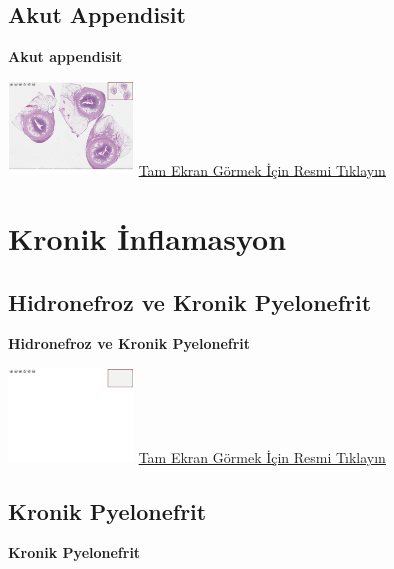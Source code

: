 \documentclass[
  letterpaper,
  DIV=11,
  numbers=noendperiod]{scrreprt}
\begin{document}
\hypertarget{sec-akut-appendisit}{%
\section{Akut Appendisit}\label{sec-akut-appendisit}}

\textbf{Akut appendisit}

\href{https://images.patolojiatlasi.com/acute-appendicitis/HE.html}{\includegraphics[width=0.25\textwidth,height=\textheight]{./screenshots/acute-appendicitis_screenshot.png}}
\href{https://images.patolojiatlasi.com/acute-appendicitis/HE.html}{Tam
Ekran Görmek İçin Resmi Tıklayın}

\hypertarget{sec-kronik-inflamasyon}{%
\chapter{Kronik İnflamasyon}\label{sec-kronik-inflamasyon}}

\hypertarget{sec-hidronefroz-kronik-pyelonefrit}{%
\section{Hidronefroz ve Kronik
Pyelonefrit}\label{sec-hidronefroz-kronik-pyelonefrit}}

\textbf{Hidronefroz ve Kronik Pyelonefrit}

\href{https://images.patolojiatlasi.com/template/HE.html}{\includegraphics[width=0.25\textwidth,height=\textheight]{./screenshots/template_screenshot.png}}
\href{https://images.patolojiatlasi.com/chronicpyelonephritis/HE1.html}{Tam
Ekran Görmek İçin Resmi Tıklayın}

\hypertarget{sec-kronik-pyelonefrit}{%
\section{Kronik Pyelonefrit}\label{sec-kronik-pyelonefrit}}

\textbf{Kronik Pyelonefrit}
\end{document}
